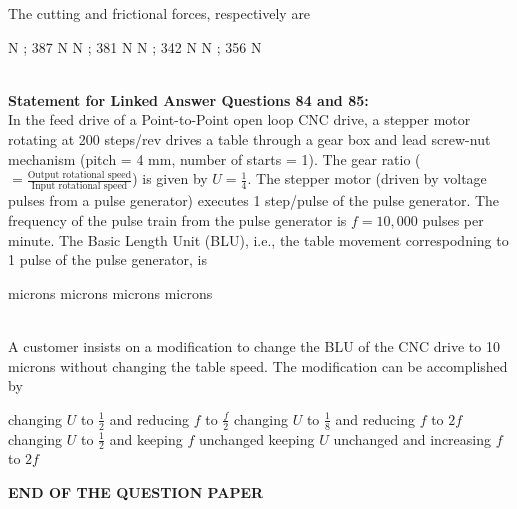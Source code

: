 \documentclass[addpoints,11pt]{exam}
\begin{document}
\begin{questions}
    \question The cutting and frictional forces, respectively are\\

    \begin{oneparchoices}
         N ; 387 N
         N ; 381 N
         N ; 342 N
         N ; 356 N
    \end{oneparchoices}\\

\normalsize\textbf{Statement for Linked Answer Questions 84 and 85:}\\
In the feed drive of a Point-to-Point open loop CNC drive, a stepper motor rotating at 200 steps/rev drives a table through a gear box and lead screw-nut mechanism (pitch = 4 mm, number of starts = 1). The gear ratio ($=\frac{\text{Output rotational speed}}{\text{Input rotational speed}}$) is given by $U=\frac{1}{4}$. The stepper motor (driven by voltage pulses from a pulse generator) executes 1 step/pulse of the pulse generator. The frequency of the pulse train from the pulse generator is $f=10,000$ pulses per minute.%
    \question The Basic Length Unit (BLU), i.e., the table movement correspodning to 1 pulse of the pulse generator, is\\

    \begin{oneparchoices}
         microns
         microns
         microns
         microns
    \end{oneparchoices}\\

    \question A customer insists on a modification to change the BLU of the CNC drive to 10 microns without changing the table speed. The modification can be accomplished by\\

    \begin{choices}
        \choice changing $U$ to $\frac{1}{2}$ and reducing $f$ to $\frac{f}{2}$
        \choice changing $U$ to $\frac{1}{8}$ and reducing $f$ to $2f$
        \choice changing $U$ to $\frac{1}{2}$ and keeping $f$ unchanged
        \choice keeping $U$ unchanged and increasing $f$ to $2f$
    \end{choices}

\vspace{1cm}
\centering\Large\textbf{END OF THE QUESTION PAPER}
\end{questions}
\end{document}
